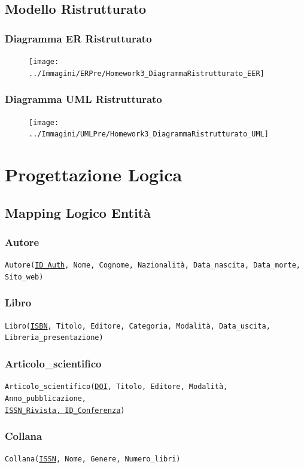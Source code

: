 \documentclass[a4paper, 15pt, oneside]{article}
\begin{document}
	\subsection{Modello Ristrutturato}
	\subsubsection{Diagramma ER Ristrutturato}
	\begin{figure}[H]
		\texttt{[image: ../Immagini/ERPre/Homework3\_DiagrammaRistrutturato\_EER]}
	\end{figure}
	\subsubsection{Diagramma UML Ristrutturato}	
	\begin{figure}[H]
		\texttt{[image: ../Immagini/UMLPre/Homework3\_DiagrammaRistrutturato\_UML]}
	\end{figure}
	\newpage
	\section{Progettazione Logica}
	\subsection{Mapping Logico Entità}
	\subsubsection{Autore}
	\texttt{Autore(\underline{ID\_Auth}, Nome, Cognome, Nazionalità, Data\_nascita, Data\_morte, Sito\_web)}
	\subsubsection{Libro}
	\texttt{Libro(\underline{ISBN}, Titolo, Editore, Categoria, Modalità, Data\_uscita, Libreria\_presentazione)}
	\subsubsection{Articolo\_scientifico}
	\texttt{Articolo\_scientifico(\underline{DOI}, Titolo, Editore, Modalità, Anno\_pubblicazione,\\ \tabto{110pt}\underline{ISSN\_Rivista, ID\_Conferenza})}
	\subsubsection{Collana}
	\texttt{Collana(\underline{ISSN}, Nome, Genere, Numero\_libri)}
\end{document}
